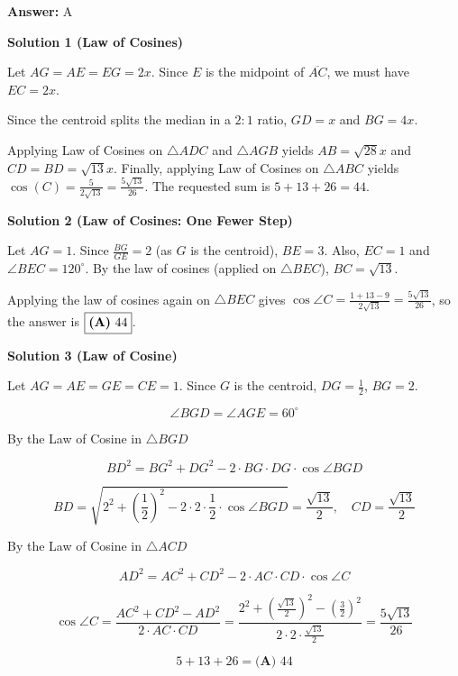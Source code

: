 \begin{enumerate}
 \textbf{Answer: }A



\textbf{Solution 1 (Law of Cosines)}

Let $AG=AE=EG=2x$. Since $E$ is the midpoint of $\overline{AC}$, we must have $EC=2x$.

 Since the centroid splits the median in a $2:1$ ratio, $GD=x$ and $BG=4x$.

 Applying Law of Cosines on $\triangle ADC$ and $\triangle{}AGB$ yields $AB=\sqrt{28}x$ and $CD=BD=\sqrt{13}x$. Finally, applying Law of Cosines on $\triangle ABC$ yields $\cos(C)=\frac{5}{2\sqrt{13}}=\frac{5\sqrt{13}}{26}$. The requested sum is $5+13+26=44$.

 



\textbf{Solution 2 (Law of Cosines: One Fewer Step)}

Let $AG = 1$. Since $\frac{BG}{GE}=2$ (as $G$ is the centroid), $BE = 3$. Also, $EC = 1$ and $\angle{BEC} = 120^{\circ}$. By the law of cosines (applied on $\triangle BEC$), $BC = \sqrt{13}$.

 Applying the law of cosines again on $\triangle BEC$ gives $\cos{\angle{C}} = \frac{1 + 13 - 9}{2\sqrt{13}} = \frac{5\sqrt{13}}{26}$, so the answer is $\fbox{\textbf{(A)}\ 44}$.

 



\textbf{Solution 3 (Law of Cosine)}

Let $AG = AE = GE = CE = 1$. Since $G$ is the centroid, $DG = \frac12$, $BG = 2$.

 
 \[\angle BGD = \angle AGE = 60^{\circ}\]

 By the Law of Cosine in $\triangle BGD$

 \[BD^2 = BG^2 + DG^2 - 2 \cdot BG \cdot DG \cdot \cos \angle BGD\]

 \[BD = \sqrt {2^2 + \left( \frac{1}{2} \right)^2 - 2 \cdot 2 \cdot \frac12 \cdot \cos \angle BGD} = \frac{\sqrt{13}}{2}, \quad CD = \frac{\sqrt{13}}{2}\]

 By the Law of Cosine in $\triangle ACD$

 \[AD^2 = AC^2 + CD^2 - 2 \cdot AC \cdot CD \cdot \cos \angle C\]

 \[\cos \angle C = \frac{ AC^2 + CD^2 - AD^2 }{ 2 \cdot AC \cdot CD } = \frac{ 2^2 + \left( \frac{\sqrt{13}}{2} \right)^2 - \left( \frac{3}{2} \right)^2 }{ 2 \cdot 2 \cdot \frac{\sqrt{13}}{2} } = \frac{ 5 \sqrt{13} }{26}\]

 \[5 + 13 + 26 = \boxed{\textbf{(A) }44}\]





\end{enumerate}

